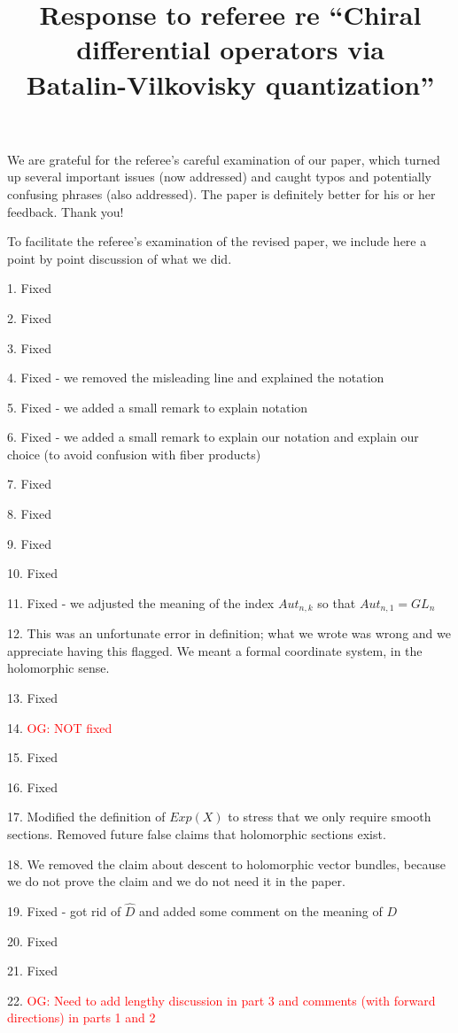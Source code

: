 \documentclass[10pt]{amsart}
\title{Response to referee re ``Chiral differential operators via\\Batalin-Vilkovisky quantization''}
\def\owen{\textcolor{red}{OG: }\textcolor{red}}
\begin{document}
\maketitle

We are grateful for the referee's careful examination of our paper, which turned up several important issues (now addressed) and caught typos and potentially confusing phrases (also addressed).
The paper is definitely better for his or her feedback.
Thank you!

To facilitate the referee's examination of the revised paper, 
we include here a point by point discussion of what we did.

1. Fixed

2. Fixed

3. Fixed

4. Fixed - we removed the misleading line and explained the notation

5. Fixed - we added a small remark to explain notation

6. Fixed - we added a small remark to explain our notation and explain our choice (to avoid confusion with fiber products)

7. Fixed

8. Fixed

9. Fixed

10. Fixed

11. Fixed - we adjusted the meaning of the index $Aut_{n,k}$ so that $Aut_{n,1} = GL_n$

12. This was an unfortunate error in definition; what we wrote was wrong and we appreciate having this flagged. We meant a formal coordinate system, in the holomorphic sense. 

13. Fixed

14. \owen{NOT fixed}


15. Fixed

16. Fixed

17. Modified the definition of $Exp(X)$ to stress that we only require smooth sections. 
Removed future false claims that holomorphic sections exist.

18. We removed the claim about descent to holomorphic vector bundles, because we do not prove the claim and we do not need it in the paper.

19. Fixed - got rid of $\hat{D}$ and added some comment on the meaning of $D$

20. Fixed

21. Fixed

22. \owen{Need to add lengthy discussion in part 3 and comments (with forward directions) in parts 1 and 2}
\end{document}
